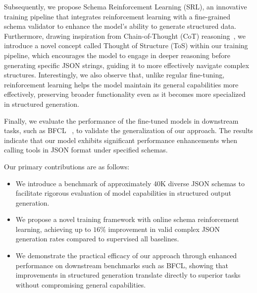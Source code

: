 Subsequently, we propose Schema Reinforcement Learning (SRL), an innovative training pipeline that integrates reinforcement learning with a fine-grained schema validator to enhance the model’s ability to generate structured data.
Furthermore, drawing inspiration from Chain-of-Thought (CoT) reasoning~\citep{wei2023chainofthought}, we introduce a novel concept called Thought of Structure (ToS) within our training pipeline, which encourages the model to engage in deeper reasoning before generating specific JSON strings, guiding it to more effectively navigate complex structures.
Interestingly, we also observe that, unlike regular fine-tuning, reinforcement learning helps the model maintain its general capabilities more effectively, preserving broader functionality even as it becomes more specialized in structured generation.




Finally, we evaluate the performance of the fine-tuned models in downstream tasks, such as BFCL~\citep{berkeley-function-calling-leaderboard} 
, to validate the generalization of our approach. 
The results indicate that our model exhibits significant performance enhancements when calling tools in JSON format under specified schemas.


Our primary contributions are as follows:
\begin{itemize}[noitemsep,topsep=0pt,parsep=0pt]
\item We introduce a benchmark of approximately 40K diverse JSON schemas to facilitate rigorous evaluation of model capabilities in structured output generation.
\item We propose a novel training framework with online schema reinforcement learning, achieving up to $16\%$ improvement in valid complex JSON generation rates compared to supervised all baselines.
\item We demonstrate the practical efficacy of our approach through enhanced performance on downstream benchmarks such as BFCL, showing that improvements in structured generation translate directly to superior tasks without compromising general capabilities.
\end{itemize}